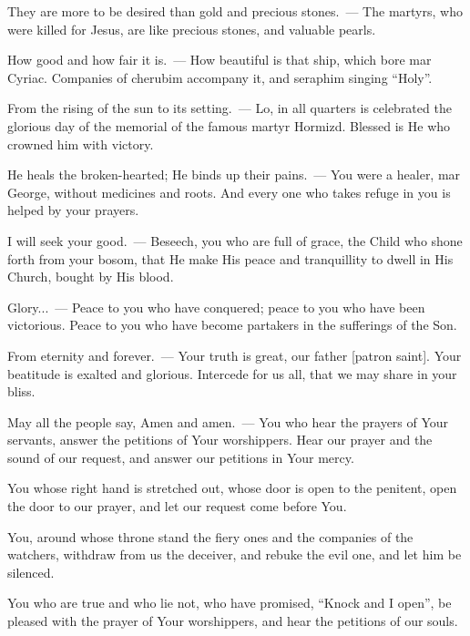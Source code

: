 \documentclass[12pt,twoside,a5paper]{article}
\begin{document}
\begin{halfparskip}
  They are more to be desired than gold and precious stones.~--- The martyrs, who were killed for Jesus, are like precious stones, and valuable pearls.

  How good and how fair it is.~--- How beautiful is that ship, which bore mar Cyriac. Companies of cherubim accompany it, and seraphim singing ``Holy''.

  From the rising of the sun to its setting.~--- Lo, in all quarters is celebrated the glorious day of the memorial of the famous martyr Hormizd. Blessed is He who crowned him with victory.

  He heals the broken-hearted; He binds up their pains.~--- You were a healer, mar George, without medicines and roots. And every one who takes refuge in you is helped by your prayers.

  I will seek your good.~--- Beseech, you who are full of grace, the Child who shone forth from your bosom, that He make His peace and tranquillity to dwell in His Church, bought by His blood.

  Glory...~--- Peace to you who have conquered; peace to you who have been victorious. Peace to you who have become partakers in the sufferings of the Son.

  From eternity and forever.~--- Your truth is great, our father [patron saint]. Your beatitude is exalted and glorious. Intercede for us all, that we may share in your bliss.

  May all the people say, Amen and amen.~--- You who hear the prayers of Your servants, answer the petitions of Your worshippers. Hear our prayer and the sound of our request, and answer our petitions in Your mercy.

  You whose right hand is stretched out, whose door is open to the penitent, open the door to our prayer, and let our request come before You.

  You, around whose throne stand the fiery ones and the companies of the watchers, withdraw from us the deceiver, and rebuke the evil one, and let him be silenced.

  You who are true and who lie not, who have promised, ``Knock and I open'', be pleased with the prayer of Your worshippers, and hear the petitions of our souls.
\end{halfparskip}

\end{document}
